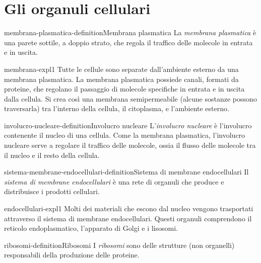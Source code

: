 \documentclass[preview]{standalone}
\begin{document}
\genpage

\section{Gli organuli cellulari}

\begin{snippetdefinition}{membrana-plasmatica-definition}{Membrana plasmatica}
    La \textit{membrana plasmatica} è una parete sottile, a doppio strato,
    che regola il traffico delle molecole in entrata e in uscita.
\end{snippetdefinition}

\begin{snippet}{membrana-expl1}
    Tutte le cellule sono separate dall'ambiente esterno da
    una membrana plasmatica.
    La membrana plasmatica possiede canali, formati da proteine, che regolano il passaggio di molecole
    specifiche in entrata e in uscita dalla cellula.
    Si crea così una membrana semipermeabile (alcune sostanze possono traversarla) tra l'interno
    della cellula, il citoplasma, e l'ambiente esterno.
\end{snippet}

\begin{snippetdefinition}{involucro-nucleare-definition}{Involucro nucleare}
    L'\textit{involucro nucleare} è l'involucro contenente il nucleo
    di una cellula. Come la membrana plasmatica, l'involucro nucleare serve a
    regolare il traffico delle molecole, ossia il flusso delle molecole tra il nucleo
    e il resto della cellula.
\end{snippetdefinition}

\begin{snippetdefinition}{sistema-membrane-endocellulari-definition}{Sistema di membrane endocellulari}
    Il \textit{sistema di membrane endocellulari} è una rete di organuli che
    produce e distribuisce i prodotti cellulari.
\end{snippetdefinition}

\begin{snippet}{endocellulari-expl1}
    Molti dei materiali che escono dal nucleo vengono trasportati attraverso il sistema di
    membrane endocellulari.
    Questi organuli comprendono il reticolo endoplasmatico, l'apparato di Golgi e i lisosomi.
\end{snippet}

\begin{snippetdefinition}{ribosomi-definition}{Ribosomi}
    I \textit{ribosomi} sono delle strutture (non organelli) responsabili della produzione delle proteine.
\end{snippetdefinition}
\end{document}
